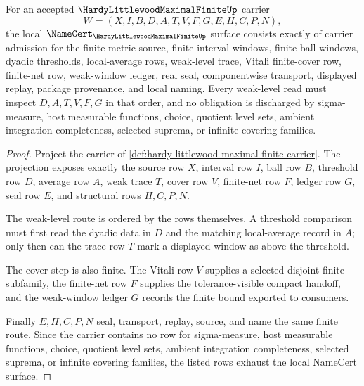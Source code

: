 \begin{theorem}
\label{thm:hardy-littlewood-maximal-finite-namecert-obligations}
For an accepted $\HardyLittlewoodMaximalFiniteUp$ carrier
$$
W=(X,I,B,D,A,T,V,F,G,E,H,C,P,N),
$$
the local $\NameCert_{\HardyLittlewoodMaximalFiniteUp}$ surface consists exactly of carrier admission for the finite metric source, finite interval windows, finite ball windows, dyadic thresholds, local-average rows, weak-level trace, Vitali finite-cover row, finite-net row, weak-window ledger, real seal, componentwise transport, displayed replay, package provenance, and local naming. Every weak-level read must inspect $D,A,T,V,F,G$ in that order, and no obligation is discharged by sigma-measure, host measurable functions, choice, quotient level sets, ambient integration completeness, selected suprema, or infinite covering families.
\end{theorem}
\begin{proof}
Project the carrier of \autoref{def:hardy-littlewood-maximal-finite-carrier}. The projection exposes exactly the source row $X$, interval row $I$, ball row $B$, threshold row $D$, average row $A$, weak trace $T$, cover row $V$, finite-net row $F$, ledger row $G$, seal row $E$, and structural rows $H,C,P,N$.

The weak-level route is ordered by the rows themselves. A threshold comparison must first read the dyadic data in $D$ and the matching local-average record in $A$; only then can the trace row $T$ mark a displayed window as above the threshold.

The cover step is also finite. The Vitali row $V$ supplies a selected disjoint finite subfamily, the finite-net row $F$ supplies the tolerance-visible compact handoff, and the weak-window ledger $G$ records the finite bound exported to consumers.

Finally $E,H,C,P,N$ seal, transport, replay, source, and name the same finite route. Since the carrier contains no row for sigma-measure, host measurable functions, choice, quotient level sets, ambient integration completeness, selected suprema, or infinite covering families, the listed rows exhaust the local NameCert surface.
\end{proof}

